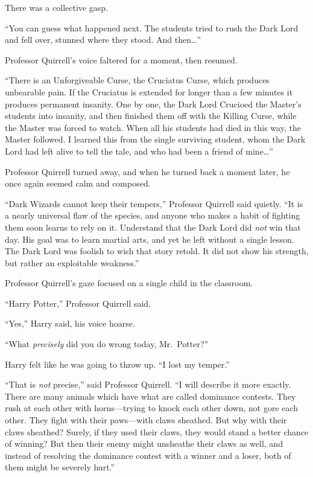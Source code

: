 There was a collective gasp.

``You can guess what happened next. The students tried to rush the Dark
Lord and fell over, stunned where they stood. And then\ldots{}''

Professor Quirrell's voice faltered for a moment, then resumed.

``There is an Unforgiveable Curse, the Cruciatus Curse, which produces
unbearable pain. If the Cruciatus is extended for longer than a few
minutes it produces permanent insanity. One by one, the Dark Lord
Crucioed the Master's students into insanity, and then finished them off
with the Killing Curse, while the Master was forced to watch. When all
his students had died in this way, the Master followed. I learned this
from the single surviving student, whom the Dark Lord had left alive to
tell the tale, and who had been a friend of mine\ldots{}''

Professor Quirrell turned away, and when he turned back a moment later,
he once again seemed calm and composed.

``Dark Wizards cannot keep their tempers,'' Professor Quirrell said
quietly. ``It is a nearly universal flaw of the species, and anyone who
makes a habit of fighting them soon learns to rely on it. Understand
that the Dark Lord did \emph{not} win that day. His goal was to learn
martial arts, and yet he left without a single lesson. The Dark Lord was
foolish to wish that story retold. It did not show his strength, but
rather an exploitable weakness.''

Professor Quirrell's gaze focused on a single child in the classroom.

``Harry Potter,'' Professor Quirrell said.

``Yes,'' Harry said, his voice hoarse.

``What \emph{precisely} did you do wrong today, Mr.~Potter?''

Harry felt like he was going to throw up. ``I lost my temper.''

``That is \emph{not} precise,'' said Professor Quirrell. ``I will
describe it more exactly. There are many animals which have what are
called dominance contests. They rush at each other with horns---trying
to knock each other down, not gore each other. They fight with their
paws---with claws sheathed. But why with their claws sheathed? Surely,
if they used their claws, they would stand a better chance of winning?
But then their enemy might unsheathe their claws as well, and instead of
resolving the dominance contest with a winner and a loser, both of them
might be severely hurt.''

